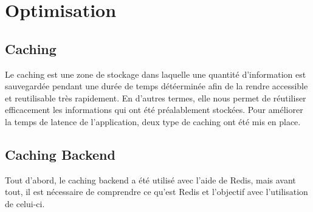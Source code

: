 \section{Optimisation}
\subsection{Caching}
Le caching est une zone de stockage dans laquelle une quantité d'information est sauvegardée pendant une durée de temps détéerminée afin de la rendre accessible et reutilisable très rapidement. En d'autres termes, elle nous permet de réutiliser efficacement les informations qui ont été préalablement stockées.
Pour améliorer la temps de latence de l'application, deux type de caching ont été mis en place.

\subsection{Caching Backend}
Tout d'abord, le caching backend a été utilisé avec l'aide de Redis, mais avant tout, il est nécessaire de comprendre ce qu'est Redis et l'objectif avec l'utilisation de celui-ci.
